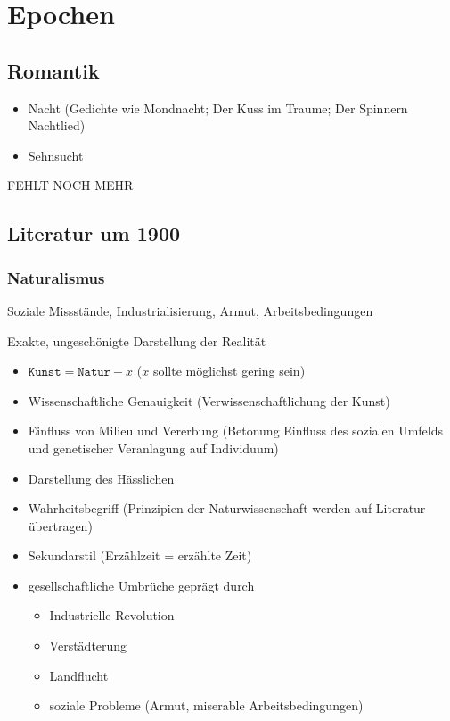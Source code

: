 

%
%

\section{Epochen}

\subsection{Romantik}
\begin{itemize}
    \item Nacht (Gedichte wie Mondnacht; Der Kuss im Traume; Der Spinnern Nachtlied)
    \item Sehnsucht
\end{itemize}
FEHLT NOCH MEHR


\subsection{Literatur um 1900}


\subsubsection{Naturalismus}

 Soziale Missstände, Industrialisierung, Armut, Arbeitsbedingungen

 Exakte, ungeschönigte Darstellung der Realität

\begin{itemize}
    \item $\texttt{Kunst} = \texttt{Natur} - x$ ($x$ sollte möglichst gering sein)
    \item Wissenschaftliche Genauigkeit (Verwissenschaftlichung der Kunst)
    \item Einfluss von Milieu und Vererbung (Betonung Einfluss des sozialen Umfelds und genetischer Veranlagung auf Individuum)
    \item Darstellung des Hässlichen
    \item Wahrheitsbegriff (Prinzipien der Naturwissenschaft werden auf Literatur übertragen)
    \item Sekundarstil (Erzählzeit = erzählte Zeit)
\end{itemize}

\begin{itemize}
    \item gesellschaftliche Umbrüche geprägt durch 
    \begin{itemize}
        \item Industrielle Revolution
        \item Verstädterung
        \item Landflucht
        \item soziale Probleme (Armut, miserable Arbeitsbedingungen)
    \end{itemize}
\end{itemize}


